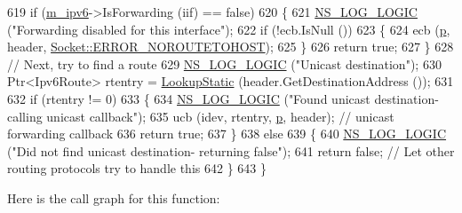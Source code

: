 \begin{DoxyCode}
619   \textcolor{keywordflow}{if} (\hyperlink{classns3_1_1Ipv6StaticRouting_aeb0293ac3549a6ca0ba7674d35646fc8}{m\_ipv6}->IsForwarding (iif) == \textcolor{keyword}{false})
620     \{
621       \hyperlink{group__logging_ga88acd260151caf2db9c0fc84997f45ce}{NS\_LOG\_LOGIC} (\textcolor{stringliteral}{"Forwarding disabled for this interface"});
622       \textcolor{keywordflow}{if} (!ecb.IsNull ())
623         \{
624           ecb (\hyperlink{lte__link__budget_8m_ac9de518908a968428863f829398a4e62}{p}, header, \hyperlink{classns3_1_1Socket_ada1328c5ae0c28cb2a982caf8f6d6ccaa0f8ecb5a4ddbce3bade35fa12c3d49e8}{Socket::ERROR\_NOROUTETOHOST});
625         \}
626       \textcolor{keywordflow}{return} \textcolor{keyword}{true};
627     \}
628   \textcolor{comment}{// Next, try to find a route}
629   \hyperlink{group__logging_ga88acd260151caf2db9c0fc84997f45ce}{NS\_LOG\_LOGIC} (\textcolor{stringliteral}{"Unicast destination"});
630   Ptr<Ipv6Route> rtentry = \hyperlink{classns3_1_1Ipv6StaticRouting_a53cafb0907cefabca6894c9d4dc6c154}{LookupStatic} (header.GetDestinationAddress ());
631 
632   \textcolor{keywordflow}{if} (rtentry != 0)
633     \{
634       \hyperlink{group__logging_ga88acd260151caf2db9c0fc84997f45ce}{NS\_LOG\_LOGIC} (\textcolor{stringliteral}{"Found unicast destination- calling unicast callback"});
635       ucb (idev, rtentry, \hyperlink{lte__link__budget_8m_ac9de518908a968428863f829398a4e62}{p}, header);  \textcolor{comment}{// unicast forwarding callback}
636       \textcolor{keywordflow}{return} \textcolor{keyword}{true};
637     \}
638   \textcolor{keywordflow}{else}
639     \{
640       \hyperlink{group__logging_ga88acd260151caf2db9c0fc84997f45ce}{NS\_LOG\_LOGIC} (\textcolor{stringliteral}{"Did not find unicast destination- returning false"});
641       \textcolor{keywordflow}{return} \textcolor{keyword}{false}; \textcolor{comment}{// Let other routing protocols try to handle this}
642     \}
643 \}
\end{DoxyCode}


Here is the call graph for this function\+:


